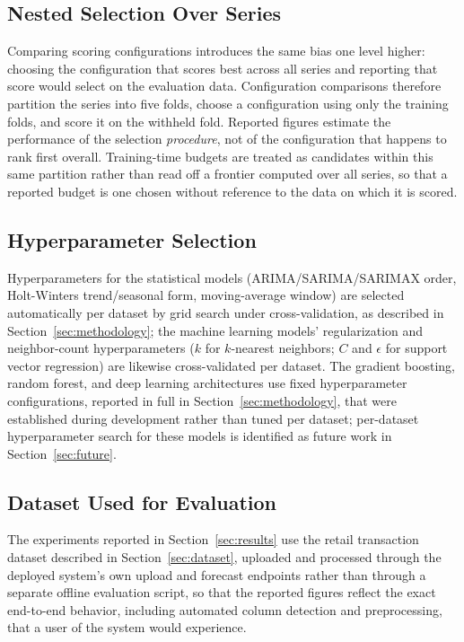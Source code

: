 \subsection{Nested Selection Over Series}
Comparing scoring configurations introduces the same bias one level higher: choosing the configuration that scores best across all series and reporting that score would select on the evaluation data. Configuration comparisons therefore partition the series into five folds, choose a configuration using only the training folds, and score it on the withheld fold. Reported figures estimate the performance of the selection \emph{procedure}, not of the configuration that happens to rank first overall. Training-time budgets are treated as candidates within this same partition rather than read off a frontier computed over all series, so that a reported budget is one chosen without reference to the data on which it is scored.

\subsection{Hyperparameter Selection}
Hyperparameters for the statistical models (ARIMA/SARIMA/SARIMAX order, Holt-Winters trend/seasonal form, moving-average window) are selected automatically per dataset by grid search under cross-validation, as described in Section~\ref{sec:methodology}; the machine learning models' regularization and neighbor-count hyperparameters ($k$ for $k$-nearest neighbors; $C$ and $\epsilon$ for support vector regression) are likewise cross-validated per dataset. The gradient boosting, random forest, and deep learning architectures use fixed hyperparameter configurations, reported in full in Section~\ref{sec:methodology}, that were established during development rather than tuned per dataset; per-dataset hyperparameter search for these models is identified as future work in Section~\ref{sec:future}.

\subsection{Dataset Used for Evaluation}
The experiments reported in Section~\ref{sec:results} use the retail transaction dataset described in Section~\ref{sec:dataset}, uploaded and processed through the deployed system's own upload and forecast endpoints rather than through a separate offline evaluation script, so that the reported figures reflect the exact end-to-end behavior, including automated column detection and preprocessing, that a user of the system would experience.
